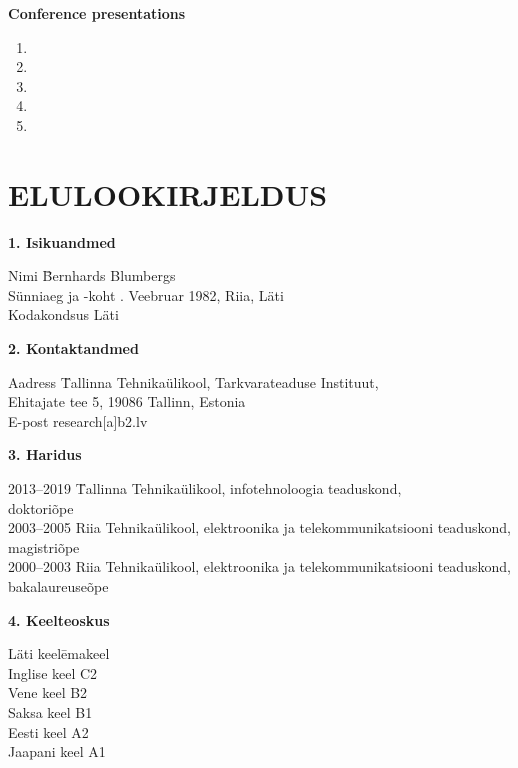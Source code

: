 \textbf{Conference presentations}
\begin{enumerate}
\item \bibentry{\FirstArticle}
\item \bibentry{\SecondArticle}
\item \bibentry{\ThirdArticle}
\item \bibentry{\SeventhArticle}
\item \bibentry{\TenthArticle}
\end{enumerate}






\newpage
\section*{ELULOOKIRJELDUS}
\textbf{1. Isikuandmed}

\begin{tabbing}
Nimi 	\quad\quad\quad\quad\quad\quad\quad\quad\quad 	\=Bernhards Blumbergs\\
S\"unniaeg ja -koht . Veebruar 1982, Riia, L\"{a}ti\\
Kodakondsus \> L\"{a}ti
\end{tabbing}

\textbf{2. Kontaktandmed}
\begin{tabbing}
Aadress	\quad\quad 	\= Tallinna  Tehnika\"ulikool, Tarkvarateaduse Instituut, \\
                        \> Ehitajate tee 5, 19086 Tallinn, Estonia \\
                        E-post\> research[a]b2.lv
\end{tabbing}

\textbf{3. Haridus}
\begin{tabbing}
2013--2019 \quad\quad \=Tallinna Tehnikaülikool, infotehnoloogia teaduskond,\\
                \>doktoriõpe\\ 
2003--2005	 	\>Riia Tehnikaülikool, elektroonika ja telekommunikatsiooni teaduskond,\\
                \>magistriõpe\\
2000--2003	 	\>Riia Tehnikaülikool, elektroonika ja telekommunikatsiooni teaduskond,\\
                \>bakalaureuseõpe\\
\end{tabbing}

\textbf{4. Keelteoskus}
\begin{tabbing}
L\"{a}ti keel\quad\quad \= emakeel\\
Inglise keel \> C2\\
Vene keel    \> B2\\
Saksa keel   \> B1\\
Eesti keel   \> A2\\
Jaapani keel \> A1\\
\end{tabbing}

